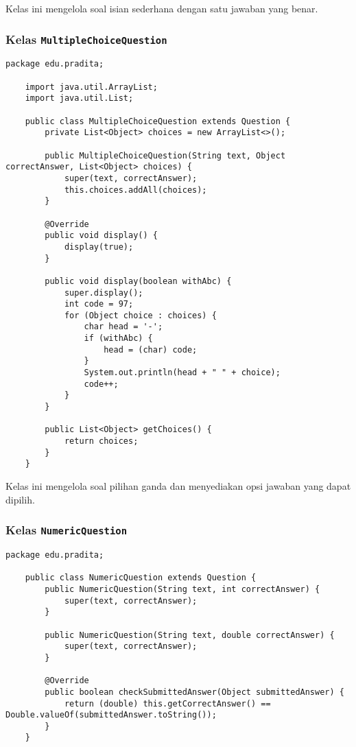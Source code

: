 Kelas ini mengelola soal isian sederhana dengan satu jawaban yang benar.

\subsubsection{Kelas \texttt{MultipleChoiceQuestion}}

\begin{lstlisting}[style=JavaStyle]
	package edu.pradita;
	
	import java.util.ArrayList;
	import java.util.List;
	
	public class MultipleChoiceQuestion extends Question {
		private List<Object> choices = new ArrayList<>();
		
		public MultipleChoiceQuestion(String text, Object correctAnswer, List<Object> choices) {
			super(text, correctAnswer);
			this.choices.addAll(choices);
		}
		
		@Override
		public void display() {
			display(true);
		}
		
		public void display(boolean withAbc) {
			super.display();
			int code = 97;
			for (Object choice : choices) {
				char head = '-';
				if (withAbc) {
					head = (char) code;
				}
				System.out.println(head + " " + choice);
				code++;
			}
		}
		
		public List<Object> getChoices() {
			return choices;
		}
	}
\end{lstlisting}

Kelas ini mengelola soal pilihan ganda dan menyediakan opsi jawaban yang dapat dipilih.

\subsubsection{Kelas \texttt{NumericQuestion}}

\begin{lstlisting}[style=JavaStyle]
	package edu.pradita;
	
	public class NumericQuestion extends Question {
		public NumericQuestion(String text, int correctAnswer) {
			super(text, correctAnswer);
		}
		
		public NumericQuestion(String text, double correctAnswer) {
			super(text, correctAnswer);
		}
		
		@Override
		public boolean checkSubmittedAnswer(Object submittedAnswer) {
			return (double) this.getCorrectAnswer() == Double.valueOf(submittedAnswer.toString());
		}
	}
\end{lstlisting}


